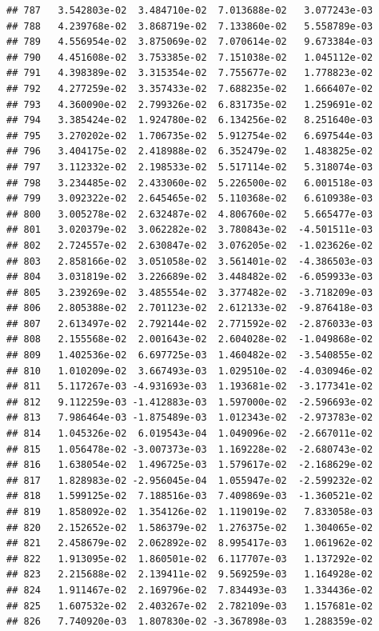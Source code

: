 \documentclass[
]{article}
\begin{document}
\begin{verbatim}
## 787   3.542803e-02  3.484710e-02  7.013688e-02   3.077243e-03
## 788   4.239768e-02  3.868719e-02  7.133860e-02   5.558789e-03
## 789   4.556954e-02  3.875069e-02  7.070614e-02   9.673384e-03
## 790   4.451608e-02  3.753385e-02  7.151038e-02   1.045112e-02
## 791   4.398389e-02  3.315354e-02  7.755677e-02   1.778823e-02
## 792   4.277259e-02  3.357433e-02  7.688235e-02   1.666407e-02
## 793   4.360090e-02  2.799326e-02  6.831735e-02   1.259691e-02
## 794   3.385424e-02  1.924780e-02  6.134256e-02   8.251640e-03
## 795   3.270202e-02  1.706735e-02  5.912754e-02   6.697544e-03
## 796   3.404175e-02  2.418988e-02  6.352479e-02   1.483825e-02
## 797   3.112332e-02  2.198533e-02  5.517114e-02   5.318074e-03
## 798   3.234485e-02  2.433060e-02  5.226500e-02   6.001518e-03
## 799   3.092322e-02  2.645465e-02  5.110368e-02   6.610938e-03
## 800   3.005278e-02  2.632487e-02  4.806760e-02   5.665477e-03
## 801   3.020379e-02  3.062282e-02  3.780843e-02  -4.501511e-03
## 802   2.724557e-02  2.630847e-02  3.076205e-02  -1.023626e-02
## 803   2.858166e-02  3.051058e-02  3.561401e-02  -4.386503e-03
## 804   3.031819e-02  3.226689e-02  3.448482e-02  -6.059933e-03
## 805   3.239269e-02  3.485554e-02  3.377482e-02  -3.718209e-03
## 806   2.805388e-02  2.701123e-02  2.612133e-02  -9.876418e-03
## 807   2.613497e-02  2.792144e-02  2.771592e-02  -2.876033e-03
## 808   2.155568e-02  2.001643e-02  2.604028e-02  -1.049868e-02
## 809   1.402536e-02  6.697725e-03  1.460482e-02  -3.540855e-02
## 810   1.010209e-02  3.667493e-03  1.029510e-02  -4.030946e-02
## 811   5.117267e-03 -4.931693e-03  1.193681e-02  -3.177341e-02
## 812   9.112259e-03 -1.412883e-03  1.597000e-02  -2.596693e-02
## 813   7.986464e-03 -1.875489e-03  1.012343e-02  -2.973783e-02
## 814   1.045326e-02  6.019543e-04  1.049096e-02  -2.667011e-02
## 815   1.056478e-02 -3.007373e-03  1.169228e-02  -2.680743e-02
## 816   1.638054e-02  1.496725e-03  1.579617e-02  -2.168629e-02
## 817   1.828983e-02 -2.956045e-04  1.055947e-02  -2.599232e-02
## 818   1.599125e-02  7.188516e-03  7.409869e-03  -1.360521e-02
## 819   1.858092e-02  1.354126e-02  1.119019e-02   7.833058e-03
## 820   2.152652e-02  1.586379e-02  1.276375e-02   1.304065e-02
## 821   2.458679e-02  2.062892e-02  8.995417e-03   1.061962e-02
## 822   1.913095e-02  1.860501e-02  6.117707e-03   1.137292e-02
## 823   2.215688e-02  2.139411e-02  9.569259e-03   1.164928e-02
## 824   1.911467e-02  2.169796e-02  7.834493e-03   1.334436e-02
## 825   1.607532e-02  2.403267e-02  2.782109e-03   1.157681e-02
## 826   7.740920e-03  1.807830e-02 -3.367898e-03   1.288359e-02

\end{verbatim}
\end{document}
